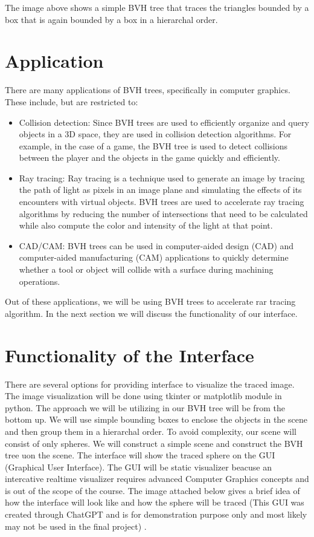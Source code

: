\documentclass{article}
\begin{document}
The image above shows a simple BVH tree that traces the triangles bounded by a box
that is again bounded by a box in a hierarchal order.

\section{Application}
There are many applications of BVH trees, specifically in computer graphics. These include, but are restricted to:
\begin{itemize}
  \item Collision detection: Since BVH trees are used to efficiently organize and query objects in a 3D space, they are used
        in collision detection algorithms. For example, in the case of a game, the BVH tree is used to detect collisions between the player and the objects in the game
        quickly and efficiently.
  \item Ray tracing: Ray tracing is a technique used to generate an image by tracing the path of light as pixels in an image plane and
        simulating the effects of its encounters with virtual objects. BVH trees are used to accelerate ray tracing algorithms by reducing the number of
        intersections that need to be calculated while also compute the color and intensity of the light at that point.
  \item CAD/CAM: BVH trees can be used in computer-aided design (CAD) and
        computer-aided manufacturing (CAM) applications to quickly determine whether a tool or object will collide with a
        surface during machining operations.
\end{itemize}

Out of these applications, we will be using BVH trees to accelerate rar tracing algorithm. In the next section we will discuss the functionality of our interface.

\section{Functionality of the Interface}

There are several options for providing interface to visualize the traced image. The image visualization will be done using tkinter or matplotlib module in python. The approach we will be utilizing in our BVH tree will be from the bottom up.
We will use simple bounding boxes to enclose the objects in the scene and then group them in a hierarchal order. To avoid complexity, our scene will consist of
only spheres. We will construct a simple scene and construct the BVH tree uon the scene. The interface will show the traced sphere on the GUI (Graphical User Interface). The GUI will be static visualizer beacuse an intercative realtime visualizer requires advanced Computer Graphics concepts and is out of the scope of the course. The image
attached below gives a brief idea of how the interface will look like and how the sphere will be traced (This GUI was created through ChatGPT and is for demonstration purpose only and most likely may not be used in the final project) \cite{chatgpt}.
\end{document}
